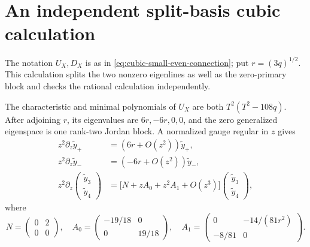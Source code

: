 \section{An independent split-basis cubic calculation}
The notation \(U_X,D_X\) is as in \eqref{eq:cubic-small-even-connection};
put \(r=(3q)^{1/2}\).  This calculation splits the two nonzero eigenlines
as well as the zero-primary block and checks the rational calculation
independently.

\begin{proposition}
\label{prop:cubic-block-data}
%
%
%
The characteristic and minimal polynomials of \(U_X\) are both
\(T^2(T^2-108q)\).  After adjoining \(r\), its eigenvalues are
\(6r,-6r,0,0\), and the zero generalized eigenspace is one rank-two Jordan
block.  A normalized gauge regular in \(z\) gives
\begin{equation}
 \begin{aligned}
 z^2\partial_z\widetilde y_+&=(6r+O(z^2))\widetilde y_+,\\
 z^2\partial_z\widetilde y_-&=(-6r+O(z^2))\widetilde y_-,\\
 z^2\partial_z
 \begin{pmatrix}\widetilde y_3\\\widetilde y_4\end{pmatrix}
 &=\bigl[N+zA_0+z^2A_1+O(z^3)\bigr]
 \begin{pmatrix}\widetilde y_3\\\widetilde y_4\end{pmatrix},
 \end{aligned}
 \label{eq:cubic-integral-block-reduction}
\end{equation}
where
\begin{equation}
 N=\begin{pmatrix}0&2\\0&0\end{pmatrix},\quad
 A_0=\begin{pmatrix}-19/18&0\\0&19/18\end{pmatrix},\quad
 A_1=\begin{pmatrix}0&-14/(81r^2)\\-8/81&0\end{pmatrix}.
 \label{eq:cubic-shared-block-data}
\end{equation}
\end{proposition}

